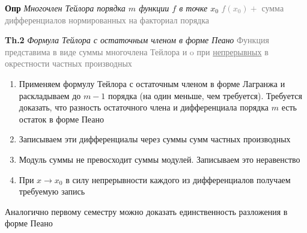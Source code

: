\textbf{Опр} \textit{Многочлен Тейлора порядка $m$ функции $f$ в точке $x_0$}
\textcolor{gray}{$f(x_0) +$ сумма дифференциалов нормированных на факториал порядка}

\textbf{Th.2} \textit{Формула Тейлора с остаточным членом в форме Пеано}
\textcolor{gray}{Функция представима в виде суммы многочлена Тейлора и o при \underline{непрерывных} в окрестности
частных производных}

\begin{enumerate}
    \item Применяем формулу Тейлора с остаточным членом в форме Лагранжа и раскладываем до $m-1$ порядка
    (на один меньше, чем требуется).
    Требуется доказать, что разность остаточного члена и дифференциала порядка $m$ есть остаток в форме Пеано
    \item Записываем эти дифференциалы через суммы сумм частных производных
    \item Модуль суммы не превосходит суммы модулей.
    Записываем это неравенство
    \item При $x \rightarrow x_0 $ в силу непрерывности каждого из дифференциалов получаем требуемую запись
\end{enumerate}

Аналогично первому семестру можно доказать единственность разложения в форме Пеано